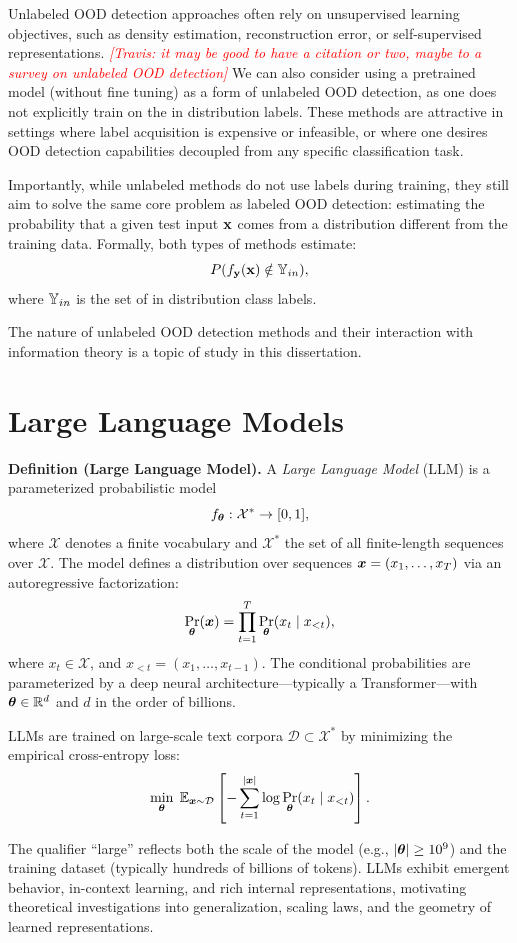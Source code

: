 \documentclass[11pt, oneside]{book}
\newcommand{\cX}{\mathcal{X}}
\newcommand{\cD}{\mathcal{D}}
\theoremstyle{plain}
\theoremstyle{definition}
\theoremstyle{remark}
\newcommand{\travis}[1]{\textcolor{red}{{\it [Travis: #1]}}}
\begin{document}
Unlabeled OOD detection approaches often rely on unsupervised learning objectives, such as density estimation, reconstruction error, or self-supervised representations. \travis{it may be good to have a citation or two, maybe to a survey on unlabeled OOD detection} We can also consider using a pretrained model (without fine tuning) as a form of unlabeled OOD detection, as one does not explicitly train on the in distribution labels. These methods are attractive in settings where label acquisition is expensive or infeasible, or where one desires OOD detection capabilities decoupled from any specific classification task.

Importantly, while unlabeled methods do not use labels during training, they still aim to solve the same core problem as labeled OOD detection: estimating the probability that a given test input \( {\mathbf{x}} \) comes from a distribution different from the training data. Formally, both types of methods estimate:
\[
P(f_{\mathbf{y}}({\mathbf{x}}) \notin {\mathbb{Y}}_{in}),
\]
where \( {\mathbb{Y}}_{in} \) is the set of in distribution class labels. 

The nature of unlabeled OOD detection methods and their interaction with information theory is a topic of study in this dissertation.

\section{Large Language Models}


\textbf{Definition (Large Language Model).}
A \emph{Large Language Model} (LLM) is a parameterized probabilistic model 
\[
f_{\vtheta} : \cX^* \rightarrow [0,1],
\]
where $\cX$ denotes a finite vocabulary and $\cX^*$ the set of all finite-length sequences over $\cX$. The model defines a distribution over sequences ${\bm{x}} = (x_1, \dots, x_T)$ via an autoregressive factorization:
\[
\Pr_{{\bm{\theta}}}({\bm{x}}) = \prod_{t=1}^{T} \Pr_{{\bm{\theta}}}(x_t \mid x_{<t}),
\]
where $x_t \in \cX$, and $x_{<t} = (x_1, \dots, x_{t-1})$. The conditional probabilities are parameterized by a deep neural architecture—typically a Transformer—with ${\bm{\theta}} \in \mathbb{R}^d$ and $d$ in the order of billions.

LLMs are trained on large-scale text corpora $\cD \subset \cX^*$ by minimizing the empirical cross-entropy loss:
\[
\min_{\vtheta} \; \E_{\vx \sim \cD} \left[ - \sum_{t=1}^{|\vx|} \log \Pr_{\vtheta}(x_t \mid x_{<t}) \right].
\]

The qualifier ``large'' reflects both the scale of the model (e.g., $|{\bm{\theta}}| \geq 10^9$) and the training dataset (typically hundreds of billions of tokens). LLMs exhibit emergent behavior, in-context learning, and rich internal representations, motivating theoretical investigations into generalization, scaling laws, and the geometry of learned representations.
\end{document}
